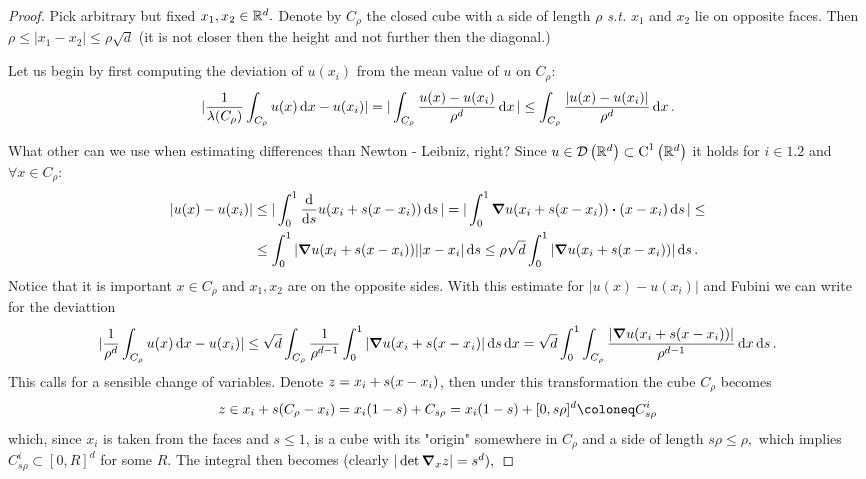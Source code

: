 \documentclass{article}
\begin{document}
\begin{proof}
	Pick arbitrary but fixed $x_1, x_2 \in {\mathbb R}^{d}.$ Denote by $C_{\rho}$ the closed cube with a side of length $\rho$ \textit{s.t.} $x_1$ and $x_2$ lie on opposite faces. Then $\rho \leq |x_1 - x_2| \leq \rho \sqrt{d}$ (it is not closer then the height and not further then the diagonal.)

Let us begin by first computing the deviation of $u(x_i)$ from the mean value of $u$ on $C_{\rho}$:
	\[
		|\frac{1}{\lambda\qty(C_{\rho})} \int_{C_{\rho}}u(x)\dd{x} - u(x_i)| = |\int_{C_{\rho}}\frac{u(x)-u(x_i)}{\rho^d}\dd{x}| \leq \int_{C_{\rho}}\frac{|u(x)-u(x_i)|}{\rho^d}\dd{x}.
	\]

	What other can we use when estimating differences than Newton - Leibniz, right? Since $u \in \mathcal{D}\!\,\left({\mathbb R}^{d} \right)\subset \text{C}^{1}\!\,\left({\mathbb R}^{d} \right)$ it holds for $i \in \qty{1,2}$ and $\forall x \in C_{\rho}:$
	\begin{align*}
		|u(x) - u(x_i)| &\leq |\int_0^1 \dv{s} u\qty(x_i + s\qty(x-x_i))\dd{s}| = |\int_0^1 \grad u\qty(x_i + s(x-x_i)) \vdot (x-x_i)\dd{s}|\leq \\
				&\leq \int_0^1 |\grad u(x_i + s(x-x_i))| |x-x_i| \dd{s} \leq \rho \sqrt{d} \int_0^1 |\grad u(x_i + s(x-x_i))| \dd{s}.
	\end{align*}
	Notice that it is important $x \in C_{\rho}$ and $x_1, x_2$ are on the opposite sides.	With this estimate for $|u(x) - u(x_i)|$ and Fubini we can write for the deviattion
	\[
		|\frac{1}{\rho^d}\int_{C_{\rho}}u(x)\dd{x} - u(x_i)| \leq \sqrt{d} \int_{C_{\rho}}\frac{1}{\rho^{d-1}}\int_0^1 |\grad u(x_i + s(x - x_i)|\dd{s}\dd{x} = \sqrt{d}\int_0^1 \int_{C_{\rho}}\frac{|\grad u(x_i + s(x-x_i))|}{\rho^{d-1}}\dd{x}\dd{s}.
	\]
	This calls for a sensible change of variables. Denote $z = x_i + s\qty(x-x_i)$, then under this transformation the cube $C_{\rho}$ becomes
	\[
		z \in x_i + s(C_{\rho}-x_i) = x_i\qty(1-s) + C_{s \rho} = x_i\qty(1-s) + [0, s \rho]^{d} \coloneq C^i_{s \rho}
	\]
	which, since $x_i$ is taken from the faces and $s \leq 1$, is a cube with its "origin" somewhere in $C_{\rho}$ and a side of length $s \rho \leq \rho,$ which implies $C_{s \rho}^i \subset [0,R]^d$ for some $R$. The integral then becomes (clearly $|\det \grad_x z| = s^d),$


\end{proof}
\end{document}
